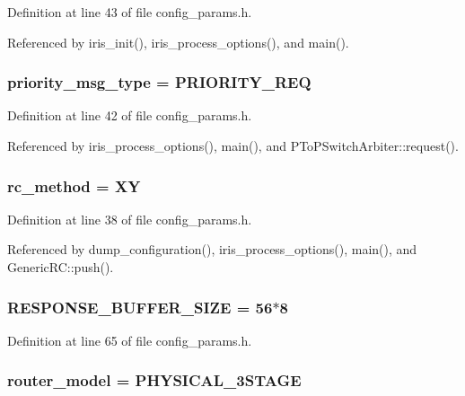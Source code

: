 Definition at line 43 of file config\_\-params.h.

Referenced by iris\_\-init(), iris\_\-process\_\-options(), and main().
\subsubsection[{priority\_\-msg\_\-type}]{ {\bf priority\_\-msg\_\-type} = PRIORITY\_\-REQ}\label{config__params_8h_d5a703dac7fa374903a9f220ede1b2d6}




Definition at line 42 of file config\_\-params.h.

Referenced by iris\_\-process\_\-options(), main(), and PToPSwitchArbiter::request().
\subsubsection[{rc\_\-method}]{ {\bf rc\_\-method} = XY}\label{config__params_8h_05eafa33205e9c1fe68de799a351f775}




Definition at line 38 of file config\_\-params.h.

Referenced by dump\_\-configuration(), iris\_\-process\_\-options(), main(), and GenericRC::push().
\subsubsection[{RESPONSE\_\-BUFFER\_\-SIZE}]{ {\bf RESPONSE\_\-BUFFER\_\-SIZE} = 56$\ast$8}\label{config__params_8h_15d2d426c9f48f49b5b35c3953238331}




Definition at line 65 of file config\_\-params.h.
\subsubsection[{router\_\-model}]{ {\bf router\_\-model} = PHYSICAL\_\-3STAGE}\label{config__params_8h_6f0d4ae068c0ef67897d116712a3eda9}




